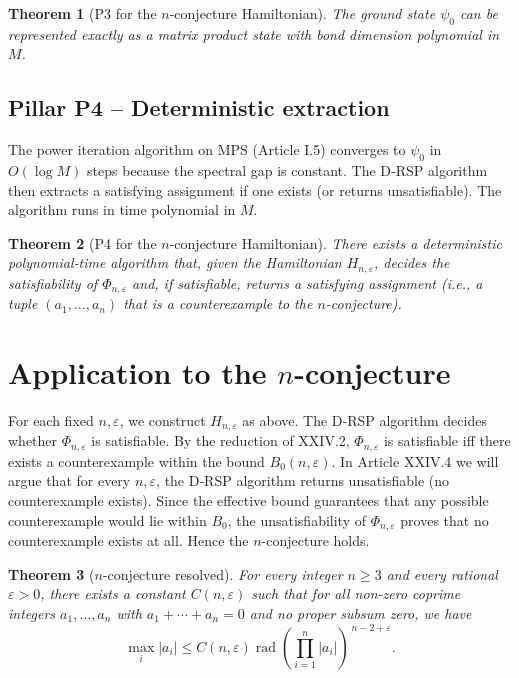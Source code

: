 \documentclass[11pt,a4paper]{article}
\newtheorem{theorem}{Theorem}[section]
\begin{document}
\begin{theorem}[P3 for the $n$-conjecture Hamiltonian]
The ground state $\psi_0$ can be represented exactly as a matrix product state with bond dimension polynomial in $M$.
\end{theorem}

\subsection{Pillar P4 – Deterministic extraction}
The power iteration algorithm on MPS (Article I.5) converges to $\psi_0$ in $O(\log M)$ steps because the spectral gap is constant. The D‑RSP algorithm then extracts a satisfying assignment if one exists (or returns unsatisfiable). The algorithm runs in time polynomial in $M$.

\begin{theorem}[P4 for the $n$-conjecture Hamiltonian]
There exists a deterministic polynomial‑time algorithm that, given the Hamiltonian $H_{n,\varepsilon}$, decides the satisfiability of $\Phi_{n,\varepsilon}$ and, if satisfiable, returns a satisfying assignment (i.e., a tuple $(a_1,\dots,a_n)$ that is a counterexample to the $n$-conjecture).
\end{theorem}

\section{Application to the $n$-conjecture}

For each fixed $n,\varepsilon$, we construct $H_{n,\varepsilon}$ as above. The D‑RSP algorithm decides whether $\Phi_{n,\varepsilon}$ is satisfiable. By the reduction of XXIV.2, $\Phi_{n,\varepsilon}$ is satisfiable iff there exists a counterexample within the bound $B_0(n,\varepsilon)$. In Article XXIV.4 we will argue that for every $n,\varepsilon$, the D‑RSP algorithm returns unsatisfiable (no counterexample exists). Since the effective bound guarantees that any possible counterexample would lie within $B_0$, the unsatisfiability of $\Phi_{n,\varepsilon}$ proves that no counterexample exists at all. Hence the $n$-conjecture holds.

\begin{theorem}[$n$-conjecture resolved]
For every integer $n\ge 3$ and every rational $\varepsilon>0$, there exists a constant $C(n,\varepsilon)$ such that for all non‑zero coprime integers $a_1,\dots,a_n$ with $a_1+\cdots+a_n=0$ and no proper subsum zero, we have
\[
\max_i |a_i| \le C(n,\varepsilon) \operatorname{rad}\!\left(\prod_{i=1}^n |a_i|\right)^{\,n-2+\varepsilon}.
\]
\end{theorem}
\end{document}
